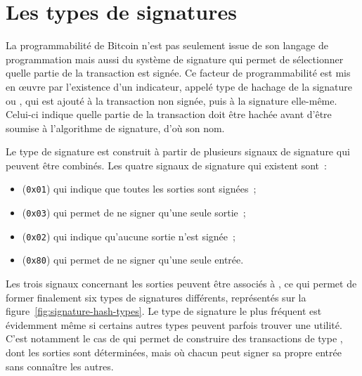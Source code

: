 \section*{Les types de signatures}


La programmabilité de Bitcoin n'est pas seulement issue de son langage de programmation mais aussi du système de signature qui permet de sélectionner quelle partie de la transaction est signée. Ce facteur de programmabilité est mis en œuvre par l'existence d'un indicateur, appelé type de hachage de la signature ou , qui est ajouté à la transaction non signée, puis à la signature elle-même. Celui-ci indique quelle partie de la transaction doit être hachée avant d'être soumise à l'algorithme de signature, d'où son nom.

Le type de signature est construit à partir de plusieurs signaux de signature qui peuvent être combinés. Les quatre signaux de signature qui existent sont~:

\begin{itemize}
\item {} (\texttt{0x01}) qui indique que toutes les sorties sont signées~;
\item {} (\texttt{0x03}) qui permet de ne signer qu'une seule sortie~;
\item {} (\texttt{0x02}) qui indique qu'aucune sortie n'est signée~;
\item {} (\texttt{0x80}) qui permet de ne signer qu'une seule entrée.
\end{itemize}

Les trois signaux concernant les sorties peuvent être associés à , ce qui permet de former finalement six types de signatures différents, représentés sur la figure~\ref{fig:signature-hash-types}. Le type de signature le plus fréquent est évidemment  même si certains autres types peuvent parfois trouver une utilité. C'est notamment le cas de  qui permet de construire des transactions de type , dont les sorties sont déterminées, mais où chacun peut signer sa propre entrée sans connaître les autres.

